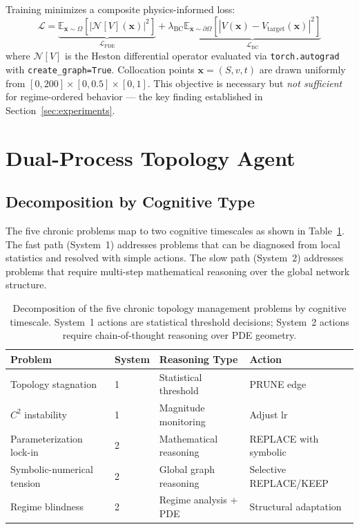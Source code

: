 \documentclass[11pt,a4paper]{article}
\begin{document}
Training minimizes a composite physics-informed loss:
\begin{equation}
\mathcal{L} = \underbrace{\mathbb{E}_{\bm{x} \sim \Omega}\!\left[\left|\mathcal{N}[V](\bm{x})\right|^2\right]}_{\mathcal{L}_\text{PDE}}
+ \lambda_\text{BC}\underbrace{\mathbb{E}_{\bm{x} \sim \partial\Omega}\!\left[\left|V(\bm{x}) - V_\text{target}(\bm{x})\right|^2\right]}_{\mathcal{L}_\text{BC}}
\label{eq:loss}
\end{equation}
where $\mathcal{N}[V]$ is the Heston differential operator evaluated via
\texttt{torch.autograd} with \texttt{create\_graph=True}. Collocation points
$\bm{x}=(S,v,t)$ are drawn uniformly from $[0,200]\times[0,0.5]\times[0,1]$.
This objective is necessary but \emph{not sufficient} for regime-ordered behavior ---
the key finding established in Section~\ref{sec:experiments}.

\section{Dual-Process Topology Agent}
\label{sec:agent}

\subsection{Decomposition by Cognitive Type}
\label{sec:agent:decomposition}

The five chronic problems map to two cognitive timescales as shown in
Table~\ref{tab:decomposition}. The fast path (System~1) addresses problems that can
be diagnosed from local statistics and resolved with simple actions. The slow path
(System~2) addresses problems that require multi-step mathematical reasoning over the
global network structure.

\begin{table}[ht]
\centering
\caption{Decomposition of the five chronic topology management problems by cognitive
timescale. System~1 actions are statistical threshold decisions; System~2 actions
require chain-of-thought reasoning over PDE geometry.}
\begin{tabular}{@{}llll@{}}
\toprule
Problem & System & Reasoning Type & Action \\
\midrule
Topology stagnation & 1 & Statistical threshold & PRUNE edge \\
$C^2$ instability & 1 & Magnitude monitoring & Adjust lr \\
Parameterization lock-in & 2 & Mathematical reasoning & REPLACE with symbolic \\
Symbolic-numerical tension & 2 & Global graph reasoning & Selective REPLACE/KEEP \\
Regime blindness & 2 & Regime analysis $+$ PDE & Structural adaptation \\
\bottomrule
\end{tabular}
\label{tab:decomposition}
\end{table}
\end{document}
